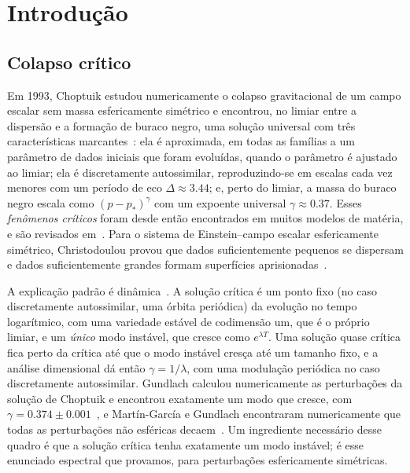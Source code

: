 \section{Introdução}\label{sec:intro}

\subsection{Colapso crítico}

Em 1993, Choptuik estudou numericamente o colapso gravitacional de um campo escalar sem massa esfericamente simétrico
e encontrou, no limiar entre a dispersão e a formação de buraco negro, uma solução universal com três características
marcantes~\cite{Choptuik1993}: ela é aproximada, em todas as famílias a um parâmetro de dados iniciais que foram evoluídas, quando o
parâmetro é ajustado ao limiar; ela é discretamente autossimilar, reproduzindo-se em escalas cada vez menores com um período de eco
$\Delta\approx3.44$; e, perto do limiar, a massa do buraco negro escala como $(p-p_*)^\gamma$ com um
expoente universal $\gamma\approx0.37$. Esses \emph{fenômenos críticos} foram desde então encontrados em muitos modelos de matéria, e são
revisados em~\cite{GundlachMartinGarcia2007}. Para o sistema de Einstein--campo escalar esfericamente simétrico, Christodoulou provou que
dados suficientemente pequenos se dispersam e dados suficientemente grandes formam superfícies aprisionadas~\cite{Christodoulou1986,
Christodoulou1991,Christodoulou1993}.

A explicação padrão é dinâmica~\cite{KoikeHaraAdachi1995,Gundlach1997}. A solução crítica é um ponto
fixo (no caso discretamente autossimilar, uma órbita periódica) da evolução no tempo logarítmico, com uma variedade
estável de codimensão um, que é o próprio limiar, e um \emph{único} modo instável, que cresce como
$e^{\lambda T}$. Uma solução quase crítica fica perto da crítica até que o modo instável cresça até um
tamanho fixo, e a análise dimensional dá então $\gamma=1/\lambda$, com uma modulação periódica no caso discretamente
autossimilar. Gundlach calculou numericamente as perturbações da solução de Choptuik e encontrou exatamente um modo que cresce,
com $\gamma=0.374\pm0.001$~\cite{Gundlach1997}, e Mart\'in-Garc\'ia e Gundlach encontraram numericamente que todas as
perturbações não esféricas decaem~\cite{MartinGarciaGundlach1999}. Um ingrediente necessário desse quadro é que a
solução crítica tenha exatamente um modo instável; é esse enunciado espectral que provamos, para perturbações
esfericamente simétricas.

